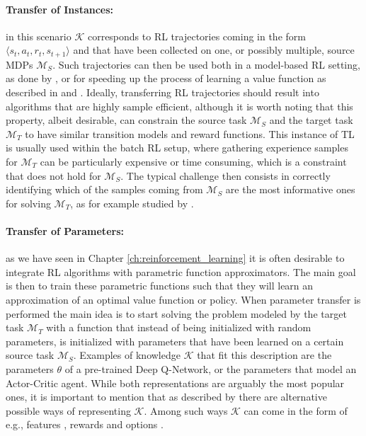 \paragraph{Transfer of Instances:} in this scenario $\mathcal{K}$ corresponds to RL trajectories coming in the form $\langle s_t, a_t, r_t, s_{t+1}\rangle$ and that have been collected on one, or possibly multiple, source MDPs $\mathcal{M}_S$. Such trajectories can then be used both in a model-based RL setting, as done by \citet{taylor2008transferring}, or for speeding up the process of learning a value function as described in \cite{lazaric2008transfer} and \cite{laroche2017transfer}. Ideally, transferring RL trajectories should result into algorithms that are highly sample efficient, although it is worth noting that this property, albeit desirable, can constrain the source task $\mathcal{M}_S$ and the target task $\mathcal{M}_T$ to have similar transition models and reward functions. This instance of TL is usually used within the batch RL setup, where gathering experience samples for $\mathcal{M}_T$ can be particularly expensive or time consuming, which is a constraint that does not hold for $\mathcal{M}_S$. The typical challenge then consists in correctly identifying which of the samples coming from $\mathcal{M}_S$ are the most informative ones for solving $\mathcal{M}_T$, as for example studied by \citet{tirinzoni2018importance}.

\paragraph{Transfer of Parameters:} as we have seen in Chapter \ref{ch:reinforcement_learning} it is often desirable to integrate RL algorithms with parametric function approximators. The main goal is then to train these parametric functions such that they will learn an approximation of an optimal value function or policy. When parameter transfer is performed the main idea is to start solving the problem modeled by the target task $\mathcal{M}_T$ with a function that instead of being initialized with random parameters, is initialized with parameters that have been learned on a certain source task $\mathcal{M}_S$. Examples of knowledge $\mathcal{K}$ that fit this description are the parameters $\theta$ of a pre-trained Deep Q-Network, or the parameters that model an Actor-Critic agent.  
\bigbreak
While both representations are arguably the most popular ones, it is important to mention that as described by \citet{tirinzoni2018transfer} there are alternative possible ways of representing $\mathcal{K}$. Among such ways $\mathcal{K}$ can come in the form of e.g., features \cite{mehta2008transfer,barreto2017successor}, rewards \cite{konidaris2006autonomous,schaal2004estimating} and options \cite{singh2005intrinsically}.

